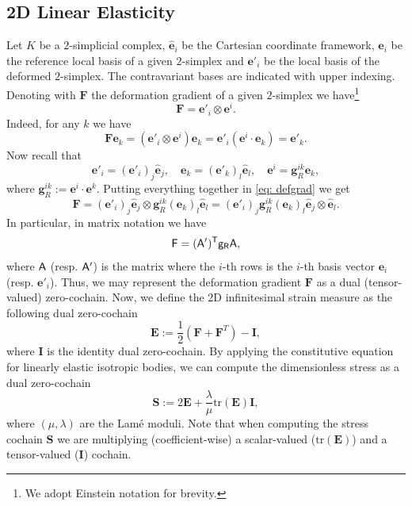 \documentclass{article}
\theoremstyle{definition} %
\theoremstyle{plain} %
\theoremstyle{remark} %
\begin{document}
\subsection{2D Linear Elasticity}
Let $K$ be a $2$-simplicial complex, $\hat{\mathbf{e}}_i$ be the Cartesian coordinate framework, ${\mathbf{e}}_i$ be the reference local basis of a given $2$-simplex and ${\mathbf{e}'}_i$ be the local basis of the deformed $2$-simplex. The contravariant bases are indicated with upper indexing. Denoting with $\mathbf{F}$ the deformation gradient of a given $2$-simplex we have\footnote{We adopt Einstein notation for brevity.}
\begin{equation}
    \mathbf{F} = {\mathbf{e}'}_i \otimes {\mathbf{e}}^i.\label{eq:  defgrad}
\end{equation}
Indeed, for any $k$ we have
\begin{equation}
    \mathbf{F} \mathbf{e}_k = ({\mathbf{e}'}_i \otimes {\mathbf{e}}^i) \mathbf{e}_k = {\mathbf{e}'}_i ({\mathbf{e}}^i \cdot {\mathbf{e}}_k) = {\mathbf{e}'}_k. 
\end{equation}
Now recall that
\begin{equation}
    {\mathbf{e}'}_i = ({\mathbf{e}'}_i)_j \hat{\mathbf{e}}_j, \quad {\mathbf{e}}_k = ({\mathbf{e}'}_k)_l \hat{\mathbf{e}}_l, \quad \mathbf{e}^i = \mathbf{g}^{ik}_R \mathbf{e}_k,
\end{equation}
where $\mathbf{g}^{ik}_R := \mathbf{e}^i \cdot \mathbf{e}^k$. Putting everything together in \eqref{eq: defgrad} we get
\begin{equation}
    \mathbf{F} = ({\mathbf{e}'}_i)_j \hat{\mathbf{e}}_j \otimes \mathbf{g}^{ik}_R ({\mathbf{e}}_k)_l \hat{\mathbf{e}}_l = ({\mathbf{e}'}_i)_j \mathbf{g}^{ik}_R ({\mathbf{e}}_k)_l \hat{\mathbf{e}}_j \otimes \hat{\mathbf{e}}_l.
\end{equation}
In particular, in matrix notation we have 
\begin{equation}
    \sf{F} = (\sf{A}')^T \sf{g}_R\sf{A},
\end{equation}
where $\sf{A}$ (resp. $\sf{A}'$) is the matrix where the $i$-th rows is the $i$-th basis vector ${\mathbf{e}}_i$ (resp. ${\mathbf{e}'}_i$). 
Thus, we may represent the deformation gradient $\mathbf{F}$ as a dual (tensor-valued) zero-cochain. Now, we define the 2D infinitesimal strain measure as the following dual zero-cochain
\begin{equation}
    \mathbf{E} := \frac{1}{2} (\mathbf{F} + \mathbf{F}^T) - \mathbf{I}, \label{eq: strain}
\end{equation}
where $\mathbf{I}$ is the identity dual zero-cochain.
By applying the constitutive equation for linearly elastic isotropic bodies, we can compute the dimensionless stress as a dual zero-cochain
\begin{equation}
    \mathbf{S} := 2 \mathbf{E} + \frac{\lambda}{\mu} \text{tr}(\mathbf{E})\mathbf{I},
\end{equation}
where $(\mu,\lambda)$ are the Lam\'e moduli. Note that when computing the stress cochain $\mathbf{S}$ we are multiplying (coefficient-wise) a scalar-valued ($\text{tr}(\mathbf{E})$) and a tensor-valued ($\mathbf{I}$) cochain.
\end{document}
